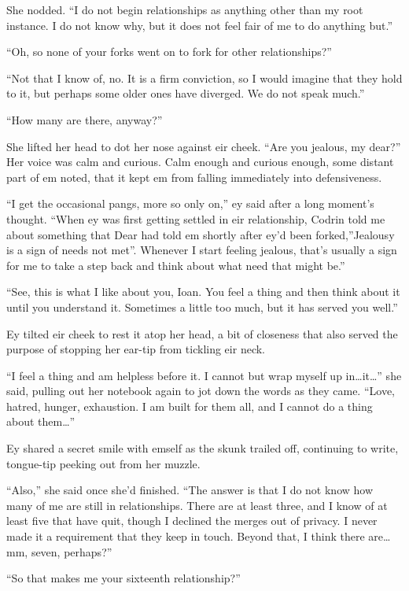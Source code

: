 She nodded. ``I do not begin relationships as anything other than my root instance. I do not know why, but it does not feel fair of me to do anything but.''

``Oh, so none of your forks went on to fork for other relationships?''

``Not that I know of, no. It is a firm conviction, so I would imagine that they hold to it, but perhaps some older ones have diverged. We do not speak much.''

``How many are there, anyway?''

She lifted her head to dot her nose against eir cheek. ``Are you jealous, my dear?'' Her voice was calm and curious. Calm enough and curious enough, some distant part of em noted, that it kept em from falling immediately into defensiveness.

``I get the occasional pangs, more so only on,'' ey said after a long moment's thought. ``When ey was first getting settled in eir relationship, Codrin told me about something that Dear had told em shortly after ey'd been forked,''Jealousy is a sign of needs not met''. Whenever I start feeling jealous, that's usually a sign for me to take a step back and think about what need that might be.''

``See, this is what I like about you, Ioan. You feel a thing and then think about it until you understand it. Sometimes a little too much, but it has served you well.''

Ey tilted eir cheek to rest it atop her head, a bit of closeness that also served the purpose of stopping her ear-tip from tickling eir neck.

``I feel a thing and am helpless before it. I cannot but wrap myself up in\ldots it\ldots{}'' she said, pulling out her notebook again to jot down the words as they came. ``Love, hatred, hunger, exhaustion. I am built for them all, and I cannot do a thing about them\ldots{}''

Ey shared a secret smile with emself as the skunk trailed off, continuing to write, tongue-tip peeking out from her muzzle.

``Also,'' she said once she'd finished. ``The answer is that I do not know how many of me are still in relationships. There are at least three, and I know of at least five that have quit, though I declined the merges out of privacy. I never made it a requirement that they keep in touch. Beyond that, I think there are\ldots mm, seven, perhaps?''

``So that makes me your sixteenth relationship?''


